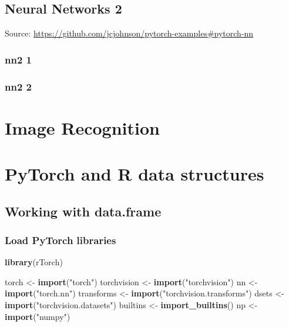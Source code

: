 \documentclass[]{book}
\newenvironment{Shaded}{\begin{snugshade}}{\end{snugshade}}
\newcommand{\KeywordTok}[1]{\textcolor[rgb]{0.13,0.29,0.53}{\textbf{#1}}}
\newcommand{\NormalTok}[1]{#1}
\newcommand{\StringTok}[1]{\textcolor[rgb]{0.31,0.60,0.02}{#1}}
\begin{document}
\hypertarget{neural-networks-2}{%
\chapter{Neural Networks 2}\label{neural-networks-2}}

Source: \url{https://github.com/jcjohnson/pytorch-examples\#pytorch-nn}

\hypertarget{nn2-1}{%
\section{nn2 1}\label{nn2-1}}

\hypertarget{nn2-2}{%
\section{nn2 2}\label{nn2-2}}

\hypertarget{part-image-recognition}{%
\part{Image Recognition}\label{part-image-recognition}}

\hypertarget{part-pytorch-and-r-data-structures}{%
\part{PyTorch and R data structures}\label{part-pytorch-and-r-data-structures}}

\hypertarget{working-with-data.frame}{%
\chapter{Working with data.frame}\label{working-with-data.frame}}

\hypertarget{load-pytorch-libraries}{%
\section{Load PyTorch libraries}\label{load-pytorch-libraries}}

\begin{Shaded}
\begin{Highlighting}[]
\KeywordTok{library}\NormalTok{(rTorch)}

\NormalTok{torch       <-}\StringTok{ }\KeywordTok{import}\NormalTok{(}\StringTok{"torch"}\NormalTok{)}
\NormalTok{torchvision <-}\StringTok{ }\KeywordTok{import}\NormalTok{(}\StringTok{"torchvision"}\NormalTok{)}
\NormalTok{nn          <-}\StringTok{ }\KeywordTok{import}\NormalTok{(}\StringTok{"torch.nn"}\NormalTok{)}
\NormalTok{transforms  <-}\StringTok{ }\KeywordTok{import}\NormalTok{(}\StringTok{"torchvision.transforms"}\NormalTok{)}
\NormalTok{dsets       <-}\StringTok{ }\KeywordTok{import}\NormalTok{(}\StringTok{"torchvision.datasets"}\NormalTok{)}
\NormalTok{builtins    <-}\StringTok{ }\KeywordTok{import_builtins}\NormalTok{()}
\NormalTok{np          <-}\StringTok{ }\KeywordTok{import}\NormalTok{(}\StringTok{"numpy"}\NormalTok{)}
\end{Highlighting}
\end{Shaded}
\end{document}
